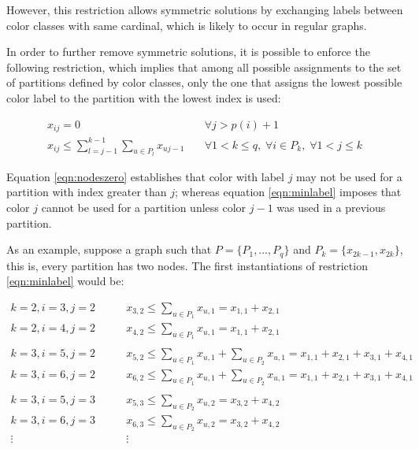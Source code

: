 However, this restriction allows symmetric solutions by exchanging labels between color classes with same cardinal, which is likely to occur in regular graphs. 

In order to further remove symmetric solutions, it is possible to enforce the following restriction, which implies that among all possible assignments to the set of partitions defined by color classes, only the one that assigns the lowest possible color label to the partition with the lowest index is used: 

\begin{align}
x_{ij} = 0 \quad &\forall j > p(i) + 1 \label{eqn:nodeszero} \\
x_{ij} \leq \sum_{l = j-1}^{k-1} \sum_{u \in P_l} x_{uj-1} \quad &\forall 1 < k \leq q, \; \forall i \in P_k, \; \forall 1 < j \leq k \label{eqn:minlabel}
\end{align}

Equation \ref{eqn:nodeszero} establishes that color with label $j$ may not be used for a partition with index greater than $j$; whereas equation \ref{eqn:minlabel} imposes that color $j$ cannot be used for a partition unless color $j-1$ was used in a previous partition.

As an example, suppose a graph such that $P = \{ P_1, \ldots, P_q \}$ and $P_k = \{ x_{2k-1}, x_{2k} \}$, this is, every partition has two nodes. The first instantiations of restriction \ref{eqn:minlabel} would be:

\begin{align*}
k = 2, i = 3, j = 2 \qquad & x_{3,2} \leq \sum_{u \in P_1} x_{u,1} = x_{1,1} + x_{2,1} \\
k = 2, i = 4, j = 2 \qquad & x_{4,2} \leq \sum_{u \in P_1} x_{u,1} = x_{1,1} + x_{2,1} \\
&\\
k = 3, i = 5, j = 2 \qquad & x_{5,2} \leq \sum_{u \in P_1} x_{u,1} + \sum_{u \in P_2} x_{u,1} = x_{1,1} + x_{2,1} + x_{3,1} + x_{4,1} \\
k = 3, i = 6, j = 2 \qquad & x_{6,2} \leq \sum_{u \in P_1} x_{u,1} + \sum_{u \in P_2} x_{u,1} = x_{1,1} + x_{2,1} + x_{3,1} + x_{4,1} \\
&\\
k = 3, i = 5, j = 3 \qquad & x_{5,3} \leq \sum_{u \in P_2} x_{u,2} = x_{3,2} + x_{4,2} \\
k = 3, i = 6, j = 3 \qquad & x_{6,3} \leq \sum_{u \in P_2} x_{u,2} = x_{3,2} + x_{4,2} \\
\vdots \qquad & \vdots
\end{align*}


